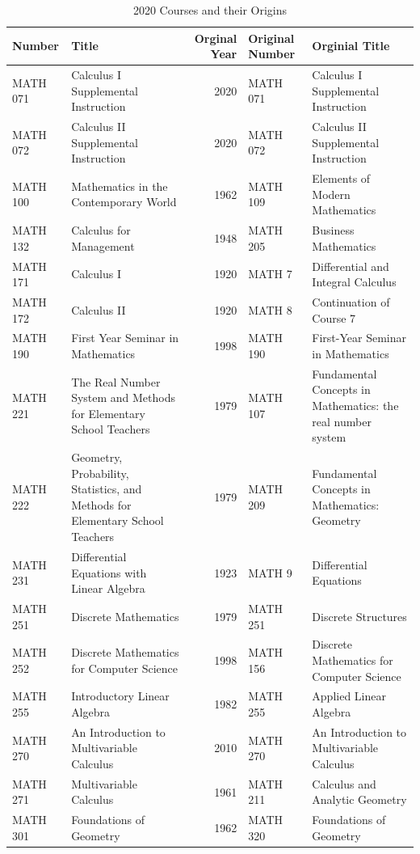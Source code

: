 \documentclass[
]{book}
\begin{document}
\begin{table}

\caption{\label{tab:willem}2020 Courses and their Origins}
\centering
\begin{tabular}[t]{llrll}
\toprule
Number & Title & Orginal Year & Original Number & Orginial Title\\
\midrule
MATH 071 & Calculus I Supplemental Instruction & 2020 & MATH 071 & Calculus I Supplemental Instruction\\
MATH 072 & Calculus II Supplemental Instruction & 2020 & MATH 072 & Calculus II Supplemental Instruction\\
MATH 100 & Mathematics in the Contemporary World & 1962 & MATH 109 & Elements of Modern Mathematics\\
MATH 132 & Calculus for Management & 1948 & MATH 205 & Business Mathematics\\
MATH 171 & Calculus I & 1920 & MATH 7 & Differential and Integral Calculus\\
\addlinespace
MATH 172 & Calculus II & 1920 & MATH 8 & Continuation of Course 7\\
MATH 190 & First Year Seminar in Mathematics & 1998 & MATH 190 & First-Year Seminar in Mathematics\\
MATH 221 & The Real Number System and Methods for Elementary School Teachers & 1979 & MATH 107 & Fundamental Concepts in Mathematics: the real number system\\
MATH 222 & Geometry, Probability, Statistics, and Methods for Elementary School Teachers & 1979 & MATH 209 & Fundamental Concepts in Mathematics: Geometry\\
MATH 231 & Differential Equations with Linear Algebra & 1923 & MATH 9 & Differential Equations\\
\addlinespace
MATH 251 & Discrete Mathematics & 1979 & MATH 251 & Discrete Structures\\
MATH 252 & Discrete Mathematics for Computer Science & 1998 & MATH 156 & Discrete Mathematics for Computer Science\\
MATH 255 & Introductory Linear Algebra & 1982 & MATH 255 & Applied Linear Algebra\\
MATH 270 & An Introduction to Multivariable Calculus & 2010 & MATH 270 & An Introduction to Multivariable Calculus\\
MATH 271 & Multivariable Calculus & 1961 & MATH 211 & Calculus and Analytic Geometry\\
\addlinespace
MATH 301 & Foundations of Geometry & 1962 & MATH 320 & Foundations of Geometry\\

\end{tabular}
\end{table}
\end{document}
